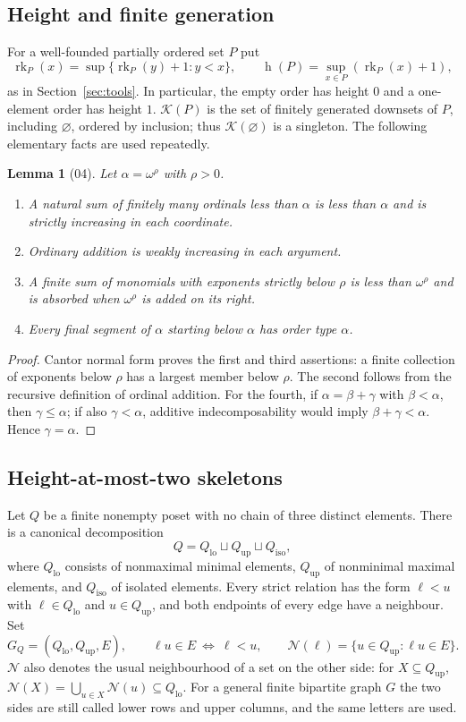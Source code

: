 \documentclass[11pt,a4paper]{article}
\newtheorem{lemma}[theorem]{Lemma}
\theoremstyle{definition}
\theoremstyle{remark}
\newcommand{\K}{\mathcal K}
\newcommand{\hgt}{\operatorname{h}}
\newcommand{\rk}{\operatorname{rk}}
\newcommand{\Qlo}{Q_{\mathrm{lo}}}
\newcommand{\Qup}{Q_{\mathrm{up}}}
\newcommand{\Qiso}{Q_{\mathrm{iso}}}
\newcommand{\Nb}{\mathcal N}
\begin{document}
\subsection{Height and finite generation}
For a well-founded partially ordered set $P$ put
\[
 \rk_P(x)=\sup\{\rk_P(y)+1:y<x\},\qquad
 \hgt(P)=\sup_{x\in P}(\rk_P(x)+1),
\]
as in Section~\ref{sec:tools}. In particular, the empty order has height $0$
and a one-element order has height $1$. $\K(P)$ is the set of finitely
generated downsets of $P$, including $\varnothing$, ordered by inclusion;
thus $\K(\varnothing)$ is a singleton. The following elementary facts are
used repeatedly.

\begin{lemma}[04]\label{nh:ur:lem:ordinalfacts}
Let $\alpha=\omega^\rho$ with $\rho>0$.
\begin{enumerate}[label=(\roman*),nosep]
\item A natural sum of finitely many ordinals less than $\alpha$ is less than
$\alpha$ and is strictly increasing in each coordinate.
\item Ordinary addition is weakly increasing in each argument.
\item A finite sum of monomials with exponents strictly below $\rho$ is less
than $\omega^\rho$ and is absorbed when $\omega^\rho$ is added on its right.
\item Every final segment of $\alpha$ starting below $\alpha$ has order type
$\alpha$.
\end{enumerate}
\end{lemma}
\begin{proof}
Cantor normal form proves the first and third assertions: a finite collection of
exponents below $\rho$ has a largest member below $\rho$. The second follows
from the recursive definition of ordinal addition. For the fourth, if
$\alpha=\beta+\gamma$ with $\beta<\alpha$, then $\gamma\le\alpha$; if also
$\gamma<\alpha$, additive indecomposability would imply
$\beta+\gamma<\alpha$. Hence $\gamma=\alpha$.
\end{proof}

\subsection{Height-at-most-two skeletons}
Let $Q$ be a finite nonempty poset with no chain of three distinct elements.
There is a canonical decomposition
\[
 Q=\Qlo\sqcup\Qup\sqcup\Qiso,
\]
where $\Qlo$ consists of nonmaximal minimal elements, $\Qup$ of nonminimal
maximal elements, and $\Qiso$ of isolated elements. Every strict relation has
the form $\ell<u$ with $\ell\in\Qlo$ and $u\in\Qup$, and both endpoints of
every edge have a neighbour. Set
\[
 G_Q=(\Qlo,\Qup,E),\qquad \ell u\in E\ \Longleftrightarrow\ \ell<u,
 \qquad \Nb(\ell)=\{u\in\Qup:\ell u\in E\}.
\]
$\Nb$ also denotes the usual neighbourhood of a set on the other side: for
$X\subseteq\Qup$, $\Nb(X)=\bigcup_{u\in X}\Nb(u)\subseteq\Qlo$. For a general
finite bipartite graph $G$ the two sides are still called lower rows and
upper columns, and the same letters are used.
\end{document}
